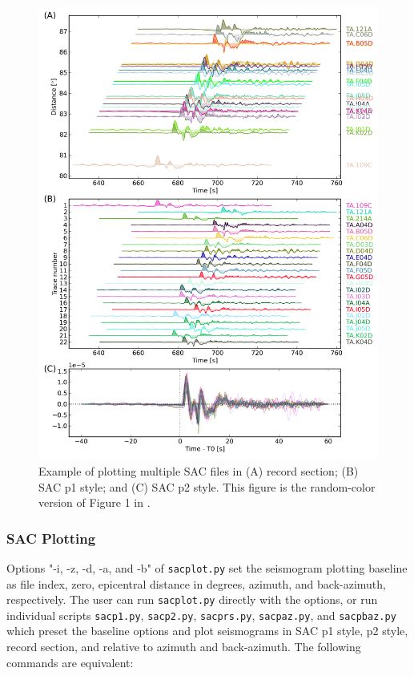 \documentclass[12pt, titlepage]{article}
\begin{document}
\begin{figure}
    \centering
    \includegraphics[width = 0.9 \textwidth]{figs/egplot.png}
    \caption{Example of plotting multiple SAC files in (A) record section; (B) SAC p1 style; and (C) SAC p2 style. 
    This figure is the random-color version of Figure 1 in \cite{pytool}. }
    \label{fig:egplot}
\end{figure}


\subsubsection{SAC Plotting}

Options "-i, -z, -d, -a, and -b" of \texttt{sacplot.py} set the seismogram plotting baseline as file index, zero, epicentral distance in degrees, azimuth, and back-azimuth, respectively. 
The user can run \texttt{sacplot.py} directly with the options, or run individual scripts
\texttt{sacp1.py}, \texttt{sacp2.py}, \texttt{sacprs.py}, \texttt{sacpaz.py}, and \texttt{sacpbaz.py} which preset the baseline options and plot seismograms in SAC p1 style, p2 style, record section, and relative to azimuth and back-azimuth. The following commands are equivalent:
\end{document}
